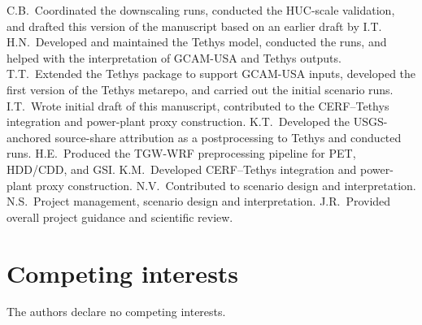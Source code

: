 \documentclass[fleqn,10pt]{wlscirep}
\begin{document}
C.B.~Coordinated the downscaling runs, conducted the HUC-scale validation, and drafted this version of the manuscript based on an earlier draft by I.T.
H.N.~Developed and maintained the Tethys model, conducted the runs, and helped with the interpretation of GCAM-USA and Tethys outputs.
T.T.~Extended the Tethys package to support GCAM-USA inputs, developed the first version of the Tethys metarepo, and carried out the initial scenario runs.
I.T.~Wrote initial draft of this manuscript, contributed to the CERF--Tethys integration and power-plant proxy construction.
K.T.~Developed the USGS-anchored source-share attribution as a postprocessing to Tethys and conducted runs.
H.E.~Produced the TGW-WRF preprocessing pipeline for PET, HDD/CDD, and GSI.
K.M.~Developed CERF--Tethys integration and power-plant proxy construction.
N.V.~Contributed to scenario design and interpretation.
N.S.~Project management, scenario design and interpretation.
J.R.~Provided overall project guidance and scientific review.

\section*{Competing interests}

The authors declare no competing interests.


\end{document}
